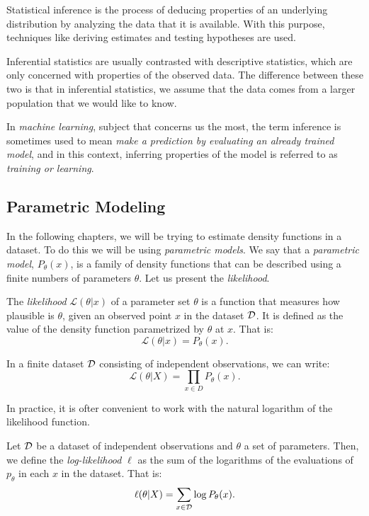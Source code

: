 Statistical inference is the process of deducing properties of an underlying distribution by analyzing the data that it is available. With this purpose, techniques like deriving estimates and testing hypotheses are used. 

Inferential statistics are usually contrasted with descriptive statistics, which are only concerned with properties of the observed data. The difference between these two is that in inferential statistics, we assume that the data comes from a larger
population that we would like to know.

In \emph{machine learning}, subject that concerns us the most, the term inference is sometimes used to mean \emph{make a prediction by evaluating an already trained model}, and in this context, inferring properties of the model is referred to as \emph{training or learning}.

\subsection{Parametric Modeling}

In the following chapters, we will be trying to estimate density functions in a dataset. To do this we will be using \emph{parametric models}. We say that a \emph{parametric model}, $P_\theta(x)$, 
is a family of density functions that can be described using a finite numbers of parameters $\theta$. Let us present the \emph{likelihood}.

\begin{ndef}
The \emph{likelihood} $\mathcal L(\theta | x)$ of a parameter set $\theta$ is a function that measures how plausible is $\theta$, given an observed point $x$ in the dataset $\mathcal{D}$. It is defined as the value of the 
density function parametrized by $\theta$ at $x$. That is:
$$
\mathcal L(\theta|x) = P_\theta(x).
$$
\end{ndef}

In a finite dataset $\mathcal{D}$ consisting of independent observations, we can write:
\[
\mathcal L(\theta | X) = \prod_{x \in D} P_\theta(x).
\]

In practice, it is ofter convenient to work with the natural logarithm of the likelihood function. 

\begin{ndef}
Let $\mathcal{D}$ be a dataset of independent observations and $\theta$ a set of parameters. Then, we define the \emph{log-likelihood} $\ell$ as the sum of the logarithms of the evaluations of $p_\theta$ in each $x$ in the dataset. That is:
\[
\ell (\theta | X) = \sum_{x \in \mathcal{D}} \log P_\theta(x).
\]
\end{ndef}


